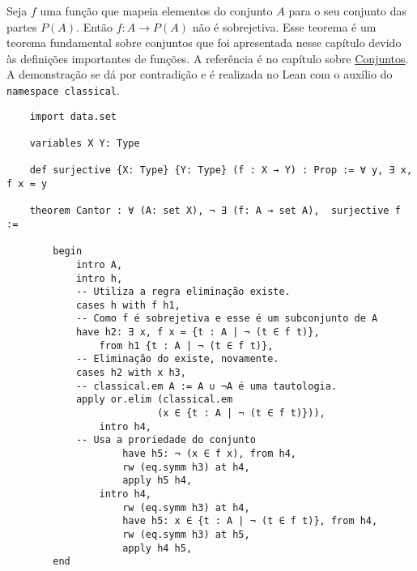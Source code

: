 \begin{example}
    \label{cantor}
    Seja $f$ uma função que mapeia elementos do conjunto $A$ para o seu conjunto das partes $P(A)$. Então $f: A \to P(A)$ 
    não é sobrejetiva. 
    Esse teorema é um teorema fundamental sobre conjuntos que foi apresentada nesse capítulo devido às definições importantes
    de funções. A referência é no capítulo sobre \hyperlink{chapter.5}{Conjuntos}. A demonstração se dá por contradição e é realizada
    no Lean com o auxílio do \lstinline{namespace classical}. 

    \begin{lstlisting}
    import data.set

    variables X Y: Type 
    
    def surjective {X: Type} {Y: Type} (f : X → Y) : Prop := ∀ y, ∃ x, f x = y
    
    theorem Cantor : ∀ (A: set X), ¬ ∃ (f: A → set A),  surjective f :=
    
        begin
            intro A,
            intro h,
            -- Utiliza a regra eliminação existe.
            cases h with f h1,
            -- Como f é sobrejetiva e esse é um subconjunto de A            
            have h2: ∃ x, f x = {t : A | ¬ (t ∈ f t)},  
                from h1 {t : A | ¬ (t ∈ f t)},
            -- Eliminação do existe, novamente. 
            cases h2 with x h3,
            -- classical.em A := A ∪ ¬A é uma tautologia. 
            apply or.elim (classical.em 
                          (x ∈ {t : A | ¬ (t ∈ f t)})),
                intro h4,
            -- Usa a proriedade do conjunto
                    have h5: ¬ (x ∈ f x), from h4,
                    rw (eq.symm h3) at h4, 
                    apply h5 h4,
                intro h4,
                    rw (eq.symm h3) at h4,
                    have h5: x ∈ {t : A | ¬ (t ∈ f t)}, from h4,
                    rw (eq.symm h3) at h5,
                    apply h4 h5,                     
        end   
    \end{lstlisting}
\end{example}
